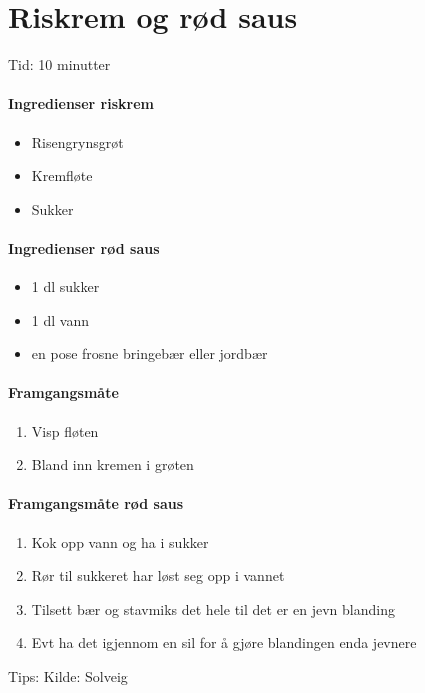 \section{﻿Riskrem og rød saus}
\label{riskrem}

Tid: 10 minutter

\paragraph{Ingredienser riskrem}
\begin{itemize}[noitemsep]
	\item Risengrynsgrøt
	\item Kremfløte
	\item Sukker
\end{itemize}

\paragraph{Ingredienser rød saus}
\begin{itemize}[noitemsep]
	\item 1 dl sukker
	\item 1 dl vann
	\item en pose frosne bringebær eller jordbær
\end{itemize}

\paragraph{Framgangsmåte}
\begin{enumerate}[noitemsep]
	\item Visp fløten
	\item Bland inn kremen i grøten
\end{enumerate}

\paragraph{Framgangsmåte rød saus}
\begin{enumerate}[noitemsep]
	\item Kok opp vann og ha i sukker
	\item Rør til sukkeret har løst seg opp i vannet
	\item Tilsett bær og stavmiks det hele til det er en jevn blanding
	\item Evt ha det igjennom en sil for å gjøre blandingen enda jevnere
\end{enumerate}




Tips:
Kilde: Solveig
